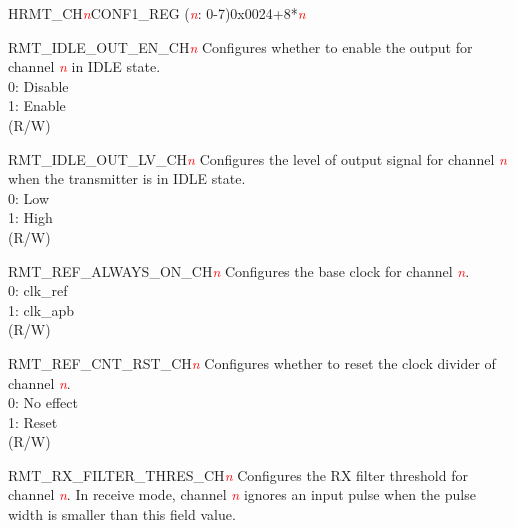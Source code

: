 \begin{register}{H}{RMT\_CH\textcolor{red}{\it{n}}CONF1\_REG (\textcolor{red}{\it{n}}: 0-7)}{0x0024+8*\textcolor{red}{\it{n}}}\label{regdesc:RMTCHnCONF1REG}
%
%
%
%
%
%
%
%
%
%
%
%
%
%
\regnewline%
\begin{regdesc}\begin{reglist}
\item [RMT\_IDLE\_OUT\_EN\_CH\textcolor{red}{\it{n}}] Configures whether to enable the output for channel \textcolor{red}{\it{n}} in IDLE state.\\
0: Disable\\
1: Enable\\ (R/W)
\item [RMT\_IDLE\_OUT\_LV\_CH\textcolor{red}{\it{n}}] Configures the level of output signal for channel \textcolor{red}{\it{n}} when the transmitter is in IDLE state.\\
0: Low\\
1: High\\ (R/W)
\item [RMT\_REF\_ALWAYS\_ON\_CH\textcolor{red}{\it{n}}] Configures the base clock for channel \textcolor{red}{\it{n}}.\\
0: clk\_ref\\
1: clk\_apb\\ (R/W)
\item [RMT\_REF\_CNT\_RST\_CH\textcolor{red}{\it{n}}] Configures whether to reset the clock divider of channel \textcolor{red}{\it{n}}.\\
0: No effect\\
1: Reset\\ (R/W)
\item [RMT\_RX\_FILTER\_THRES\_CH\textcolor{red}{\it{n}}] Configures the RX filter threshold for channel \textcolor{red}{\it{n}}. In receive mode, channel \textcolor{red}{\it{n}} ignores an input pulse when the pulse width is smaller than this field value.\\

\end{reglist}
\end{regdesc}
\end{register}
